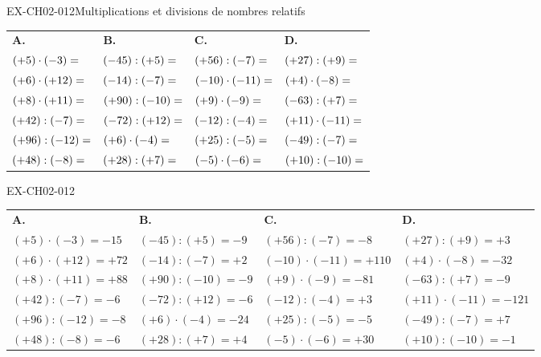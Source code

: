 \documentclass[12pt, a4paper]{article}
\begin{document}
\begin{exercice}{EX-CH02-012}{Multiplications et divisions de nombres relatifs}
{\small
\bigskip
\def\arraystretch{1.7}
\begin{tabularx}{\linewidth}{*{4}{X}}
\textbf{A.} & \textbf{B.} & \textbf{C.} & \textbf{D.} \\
$(+5)\cdot(-3)= \dotfill$    & $(-45):(+5)= \dotfill$  & $(+56):(-7)= \dotfill$      & $(+27):(+9)= \dotfill$      \\
$(+6)\cdot(+12)= \dotfill$   & $(-14):(-7)= \dotfill$  & $(-10)\cdot(-11)= \dotfill$ & $(+4)\cdot(-8)= \dotfill$   \\
$(+8)\cdot(+11)= \dotfill$   & $(+90):(-10)= \dotfill$ & $(+9)\cdot(-9)= \dotfill$   & $(-63):(+7)= \dotfill$      \\
$(+42):(-7)= \dotfill$       & $(-72):(+12)= \dotfill$ & $(-12):(-4)= \dotfill$      & $(+11)\cdot(-11)= \dotfill$ \\
$(+96):(-12)= \dotfill$      & $(+6)\cdot(-4)= \dotfill$ & $(+25):(-5)= \dotfill$    & $(-49):(-7)= \dotfill$      \\
$(+48):(-8)= \dotfill$       & $(+28):(+7)= \dotfill$  & $(-5)\cdot(-6)= \dotfill$   & $(+10):(-10)= \dotfill$     \\
\end{tabularx}
}
\end{exercice}
\begin{solution}{EX-CH02-012}

\def\arraystretch{1.7}
\begin{tabularx}{\linewidth}{*{4}{X}}
\textbf{A.} & \textbf{B.} & \textbf{C.} & \textbf{D.} \\
$(+5)\cdot(-3)=-15$    & $(-45):(+5)=-9$   & $(+56):(-7)=-8$       & $(+27):(+9)=+3$      \\
$(+6)\cdot(+12)=+72$   & $(-14):(-7)=+2$   & $(-10)\cdot(-11)=+110$& $(+4)\cdot(-8)=-32$  \\
$(+8)\cdot(+11)=+88$   & $(+90):(-10)=-9$  & $(+9)\cdot(-9)=-81$   & $(-63):(+7)=-9$      \\
$(+42):(-7)=-6$        & $(-72):(+12)=-6$  & $(-12):(-4)=+3$       & $(+11)\cdot(-11)=-121$\\
$(+96):(-12)=-8$       & $(+6)\cdot(-4)=-24$ & $(+25):(-5)=-5$     & $(-49):(-7)=+7$      \\
$(+48):(-8)=-6$        & $(+28):(+7)=+4$   & $(-5)\cdot(-6)=+30$   & $(+10):(-10)=-1$     \\
\end{tabularx}

\end{solution}
\end{document}
